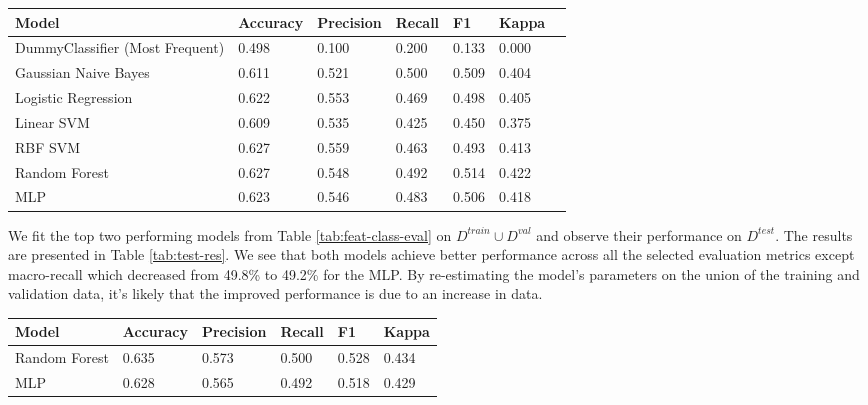 \documentclass{article}
\begin{document}
\begin{table*}[h]
\caption{Evaluation of classifiers on validation set without phrase length as an additional feature. Improvements in model performance are colored in green, and worse performance is colored in red.} 
\label{tab:class-eval}
\centering 
\setlength\aboverulesep{0pt}
\setlength\belowrulesep{0pt}
\setlength\doublerulesep{0pt}
\setlength\extrarowheight{3pt}
\small
\begin{tabularx}{0.9\textwidth}{l p{1.5cm} XXXXX}
    \toprule
    Model & Accuracy & Precision & Recall & F1 & Kappa \\
    \midrule 
    DummyClassifier (Most Frequent) & 0.498 & 0.100 & 0.200 & 0.133 & 0.000 \\ 
    Gaussian Naive Bayes & 0.611 & 0.521 & 0.500 & 0.509 & 0.404 \\ 
    Logistic Regression & 0.622 & \cellcolor{red!25}0.553 & 0.469 & \cellcolor{red!25}0.498 & 0.405 \\ 
    Linear SVM & \cellcolor{green!25}0.609 & \cellcolor{red!25}0.535 & \cellcolor{red!25}0.425 & \cellcolor{green!25}0.450 & \cellcolor{red!25}0.375 \\ 
    RBF SVM & 0.627 & 0.559 & 0.463 & 0.493 & 0.413 \\ 
    Random Forest & 0.627 & \cellcolor{red!25}0.548 & \cellcolor{red!25}0.492 & \cellcolor{red!25}0.514 & \cellcolor{green!25}0.422 \\ 
    MLP & \cellcolor{red!25}0.623 & \cellcolor{green!25}0.546 & \cellcolor{red!25}0.483 & \cellcolor{red!25}0.506 & \cellcolor{red!25}0.418 \\
    \bottomrule
\end{tabularx}
\end{table*}

We fit the top two performing models from Table \ref{tab:feat-class-eval} on $D^{train} \cup D^{val}$ and observe their performance on $D^{test}$. The results are presented in Table \ref{tab:test-res}. We see that both models achieve better performance across all the selected evaluation metrics except macro-recall which decreased from 49.8\% to 49.2\% for the MLP. By re-estimating the model's parameters on the union of the training and validation data, it's likely that the improved performance is due to an increase in data. 

\begin{table*}[h]
\caption{Best performing model results on test set.} 
\label{tab:test-res}
\centering 
\setlength\aboverulesep{0pt}
\setlength\belowrulesep{0pt}
\setlength\doublerulesep{0pt}
\setlength\extrarowheight{3pt}
\small
\begin{tabularx}{0.9\textwidth}{XXXXXX}
    \toprule
    Model & Accuracy & Precision & Recall & F1 & Kappa \\
    \midrule 
    Random Forest & 0.635 & 0.573 & 0.500 & 0.528 & 0.434 \\ 
    MLP & 0.628 & 0.565 & 0.492 & 0.518 & 0.429 \\ 
    \bottomrule
\end{tabularx}
\end{table*}
\end{document}
